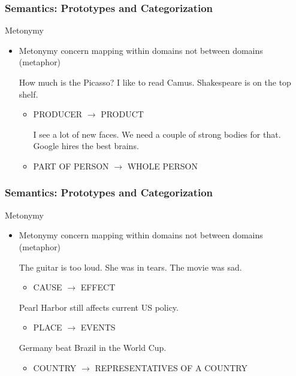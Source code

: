 \documentclass[12pt, table]{beamer}
\begin{document}
\begin{frame}
\frametitle{Semantics: Prototypes and Categorization}
Metonymy
\begin{itemize}
\item Metonymy concern mapping within domains not between domains (metaphor)
\begin{exe}
\ex How much is the Picasso?
\ex I like to read Camus.
\ex Shakespeare is on the top shelf.
\end{exe} 
\begin{itemize}
\item PRODUCER $\rightarrow$ PRODUCT 
\begin{exe}
\ex I see a lot of new faces.
\ex We need a couple of strong bodies for that.
\ex Google hires the best brains.
\end{exe} 
\item PART OF PERSON $\rightarrow$ WHOLE PERSON 
\end{itemize}
\end{itemize}
\end{frame}

\begin{frame}
\frametitle{Semantics: Prototypes and Categorization}
Metonymy
\begin{itemize}
\item Metonymy concern mapping within domains not between domains (metaphor)
\begin{exe}
\ex The guitar is too loud.
\ex She was in tears.
\ex The movie was sad.
\end{exe} 
\begin{itemize}
\item CAUSE $\rightarrow$ EFFECT 
\end{itemize}
\begin{exe}
\ex Pearl Harbor still affects current US policy.
\end{exe} 
\begin{itemize}
\item PLACE $\rightarrow$ EVENTS 
\end{itemize}
\begin{exe}
\ex Germany beat Brazil in the World Cup.
\end{exe} 
\begin{itemize}
\item COUNTRY $\rightarrow$ REPRESENTATIVES OF A COUNTRY 
\end{itemize}
\end{itemize}
\end{frame}
\end{document}
